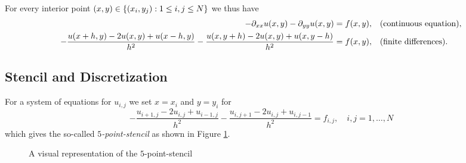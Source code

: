 For every interior point \(\parentheses*{x, y} \in \braces*{\parentheses*{x_i, y_j} : 1 \le i, j \le N}\) we thus have
\begin{align*}
	-\partial_{xx}u\parentheses*{x, y} - \partial_{yy}u\parentheses*{x, y} &= f\parentheses*{x, y}, && \text{(continuous equation)},\\
	-\frac{u\parentheses*{x + h, y} - 2u\parentheses*{x, y} + u\parentheses*{x - h, y}}{h^2} - \frac{u\parentheses*{x, y + h} - 2u\parentheses*{x, y} + u\parentheses*{x, y - h}}{h^2} &= f\parentheses*{x, y}, && \text{(finite differences)}.
\end{align*}


\subsection{Stencil and Discretization}

For a system of equations for \(u_{i, j}\) we set \(x = x_i\) and \(y = y_i\) for
\[
	-\frac{u_{i + 1, j} - 2u_{i, j} + u_{i - 1, j}}{h^2} - \frac{u_{i, j + 1} - 2u_{i, j} + u_{i, j - 1}}{h^2} = f_{i, j}, \quad i, j = 1, \ldots, N
\]
which gives the so-called \emph{\(5\)-point-stencil} as shown in Figure \ref{fig:1-1}.

\begin{figure}[h]
	\centering
	\caption{A visual representation of the \(5\)-point-stencil}
	\label{fig:1-1}
\end{figure}

